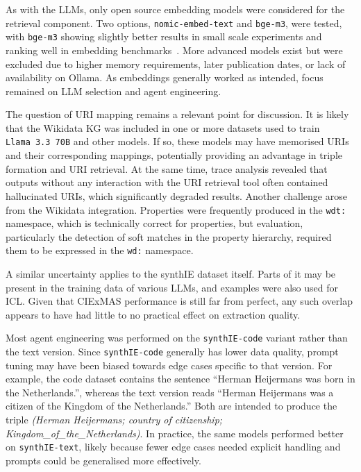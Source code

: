 \documentclass[a4paper,oneside,bibliography=totoc]{scrbook}
\begin{document}
As with the \acp{LLM}, only open source embedding models were considered for the retrieval component. Two options, \texttt{nomic-embed-text} and \texttt{bge-m3}, were tested, with \texttt{bge-m3} showing slightly better results in small scale experiments and ranking well in embedding benchmarks~\cite{Muennighoff2023}. More advanced models exist but were excluded due to higher memory requirements, later publication dates, or lack of availability on Ollama. As embeddings generally worked as intended, focus remained on \ac{LLM} selection and agent engineering.

The question of \ac{URI} mapping remains a relevant point for discussion. It is likely that the Wikidata \ac{KG} was included in one or more datasets used to train \texttt{Llama~3.3~70B} and other models. If so, these models may have memorised \acp{URI} and their corresponding mappings, potentially providing an advantage in triple formation and \ac{URI} retrieval. At the same time, trace analysis revealed that outputs without any interaction with the \ac{URI} retrieval tool often contained hallucinated \acp{URI}, which significantly degraded results. Another challenge arose from the Wikidata integration. Properties were frequently produced in the \texttt{wdt:} namespace, which is technically correct for properties, but evaluation, particularly the detection of soft matches in the property hierarchy, required them to be expressed in the \texttt{wd:} namespace.

A similar uncertainty applies to the synthIE dataset itself. Parts of it may be present in the training data of various \acp{LLM}, and examples were also used for \ac{ICL}. Given that CIExMAS performance is still far from perfect, any such overlap appears to have had little to no practical effect on extraction quality.

Most agent engineering was performed on the \texttt{synthIE-code} variant rather than the text version. Since \texttt{synthIE-code} generally has lower data quality, prompt tuning may have been biased towards edge cases specific to that version. For example, the code dataset contains the sentence \enquote{Herman Heijermans was born in the Netherlands.}, whereas the text version reads \enquote{Herman Heijermans was a citizen of the Kingdom of the Netherlands.} Both are intended to produce the triple \textit{(Herman Heijermans; country of citizenship; Kingdom\_of\_the\_Netherlands)}. In practice, the same models performed better on \texttt{synthIE-text}, likely because fewer edge cases needed explicit handling and prompts could be generalised more effectively.
\end{document}
